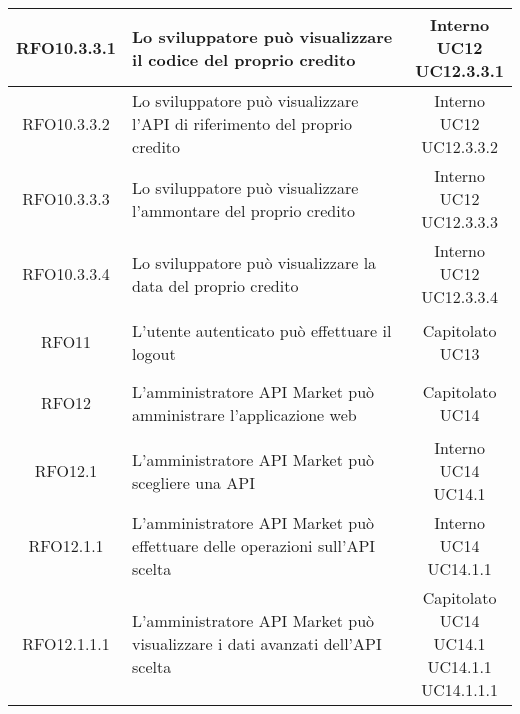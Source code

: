 \begin{longtable}{|c|p{8cm}|c|}
\hypertarget{RFO10.3.3.1}{RFO10.3.3.1} & Lo sviluppatore può visualizzare il codice del proprio credito & \makecell*{Interno\\UC12\\UC12.3.3.1} \\
\hline
\hypertarget{RFO10.3.3.2}{RFO10.3.3.2} & Lo sviluppatore può visualizzare l'API di riferimento del proprio credito & \makecell*{Interno\\UC12\\UC12.3.3.2} \\
\hline
\hypertarget{RFO10.3.3.3}{RFO10.3.3.3} & Lo sviluppatore può visualizzare l'ammontare del proprio credito & \makecell*{Interno\\UC12\\UC12.3.3.3} \\
\hline
\hypertarget{RFO10.3.3.4}{RFO10.3.3.4} & Lo sviluppatore può visualizzare la data del proprio credito & \makecell*{Interno\\UC12\\UC12.3.3.4} \\
\hline

\hypertarget{RFO11}{RFO11} & L'utente autenticato può effettuare il logout & \makecell*{Capitolato\\UC13} \\
\hline

\hypertarget{RFO12}{RFO12} & L'amministratore API Market può amministrare l'applicazione web & \makecell*{Capitolato\\UC14} \\
\hline

\hypertarget{RFO12.1}{RFO12.1} & L'amministratore API Market può scegliere una API & \makecell*{Interno\\UC14\\UC14.1} \\
\hline

\hypertarget{RFO12.1.1}{RFO12.1.1} & L'amministratore API Market può effettuare delle operazioni sull'API scelta & \makecell*{Interno\\UC14\\UC14.1.1} \\
\hline

\hypertarget{RFO12.1.1.1}{RFO12.1.1.1} & L'amministratore API Market può visualizzare i dati avanzati dell'API scelta & \makecell*{Capitolato\\UC14\\UC14.1\\UC14.1.1\\UC14.1.1.1} \\
\hline


\end{longtable}
